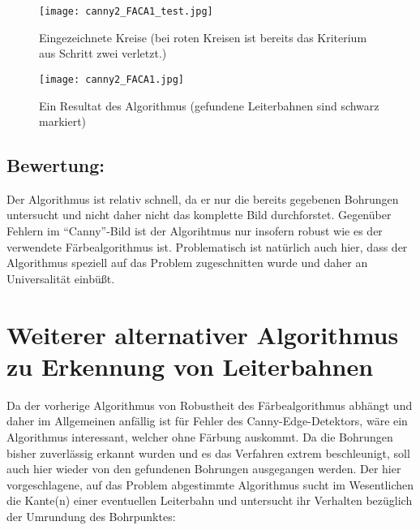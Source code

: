 \begin{figure}[H]
  \begin{center}
    \texttt{[image: canny2\_FACA1\_test.jpg]}
    \caption{Eingezeichnete Kreise (bei roten Kreisen ist bereits das Kriterium aus Schritt zwei verletzt.)}
    \label{fig:l_alg_1_test}
  \end{center}
\end{figure}

\begin{figure}[H]
  \begin{center}
    \texttt{[image: canny2\_FACA1.jpg]}
    \caption{Ein Resultat des Algorithmus (gefundene Leiterbahnen sind schwarz markiert)}
    \label{fig:l_alg_1}
  \end{center}
\end{figure}

\subsection{Bewertung:}
Der Algorithmus ist relativ schnell, da er nur die bereits gegebenen Bohrungen untersucht und nicht daher nicht das komplette Bild durchforstet. \newline
Gegenüber Fehlern im “Canny”-Bild ist der Algorihtmus nur insofern robust wie es der verwendete Färbealgorithmus ist. \newline
Problematisch ist natürlich auch hier, dass der Algorithmus speziell auf das Problem zugeschnitten wurde und daher an Universalität einbüßt.

\section{Weiterer alternativer Algorithmus zu Erkennung von Leiterbahnen}
Da der vorherige Algorithmus von Robustheit des Färbealgorithmus abhängt und daher im Allgemeinen anfällig ist für Fehler des Canny-Edge-Detektors, wäre ein Algorithmus interessant, welcher ohne Färbung auskommt. \newline
Da die Bohrungen bisher zuverlässig erkannt wurden und es das Verfahren extrem beschleunigt, soll auch hier wieder von den gefundenen Bohrungen ausgegangen werden. \newline
Der hier vorgeschlagene, auf das Problem abgestimmte Algorithmus sucht im Wesentlichen die Kante(n) einer eventuellen Leiterbahn und untersucht ihr Verhalten bezüglich der Umrundung des Bohrpunktes: \newline

